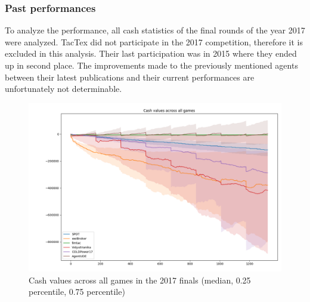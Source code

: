 \subsubsection{Past performances}%
\label{ssub:past_performances}

To analyze the performance, all cash statistics of the final rounds of the year 2017 were analyzed. TacTex did not
participate in the 2017 competition, therefore it is excluded in this analysis. Their last participation was in 2015
where they ended up in second place. The improvements made to the previously mentioned agents between their latest
publications and their current performances are unfortunately not determinable.
\begin{figure}[]
    \centering
    \includegraphics[width=1.0\linewidth]{img/cash_vals_across_games.png}
    \caption{Cash values across all games in the 2017 finals (median, 0.25 percentile, 0.75 percentile)}
    \label{fig:cash_vals_across_games}
\end{figure}

